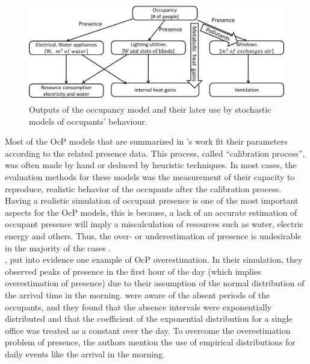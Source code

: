 \begin{figure}[h!]
  \vspace{0.5em} %
  \includegraphics[width=\linewidth]{Figures/Page_presence_scheme.jpg}
  \caption{Outputs of the occupancy model and their later use by stochastic models of occupants’ behaviour. \cite{page_2008}}
  \label{fig:OCC_MODEL}
\end{figure}

Most of the OcP models that are summarized in \citeauthor{page_2008}'s work fit their parameters according to the related presence data. This process, called “calibration process”, was often made by hand or deduced by heuristic techniques. In most cases, the evaluation methods for these models was the measurement of their capacity to reproduce, realistic behavior of the occupants after the calibration process. Having a realistic simulation of occupant presence
is one of the most important aspects for the OcP models, this is because, a lack of an accurate estimation of occupant presence will imply a miscalculation of resources such as water, electric energy and others. Thus, the over- or underestimation of presence is undesirable in the majority of the cases \cite{page_2008, wang_2005, profile_comp_2001}.\\


\citeauthor{wang_2005}, \citeyear{wang_2005} \cite{wang_2005} put into evidence one example of OcP overestimation. In their simulation, they observed peaks of presence in the first hour of the day (which implies overestimation of presence) due to their assumption of the normal distribution of the arrival time in the morning. \citeauthor{wang_2005} were aware of the absent periods of the occupants, and they found that the absence intervals were exponentially distributed and that the coefficient of the exponential distribution for a single office was treated as a constant over the day. To overcome the overestimation problem of presence,  the authors mention the use of empirical distributions for daily events like the arrival in the morning.    


